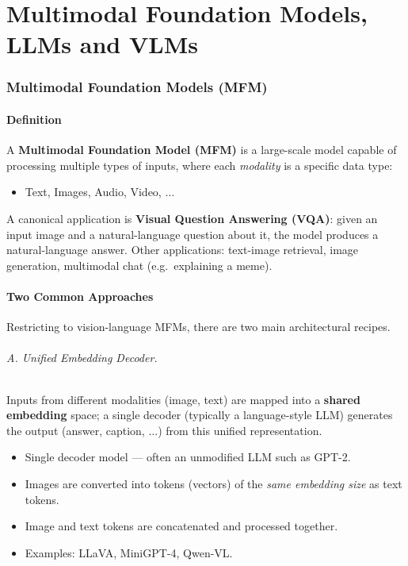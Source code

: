 \documentclass[11pt,a4paper]{article}
\theoremstyle{definition}
\theoremstyle{plain}
\theoremstyle{remark}
\begin{document}
\part{Multimodal Foundation Models, LLMs and VLMs}

\section{Multimodal Foundation Models (MFM)}

\subsection{Definition}

A \textbf{Multimodal Foundation Model (MFM)} is a large-scale model capable of processing multiple types of inputs, where each \emph{modality} is a specific data type:
\begin{itemize}
    \item Text, Images, Audio, Video, $\ldots$
\end{itemize}

A canonical application is \textbf{Visual Question Answering (VQA)}: given an input image and a natural-language question about it, the model produces a natural-language answer. Other applications: text-image retrieval, image generation, multimodal chat (e.g.\ explaining a meme).

\subsection{Two Common Approaches}

Restricting to vision-language MFMs, there are two main architectural recipes.

\paragraph{A. Unified Embedding Decoder.} Inputs from different modalities (image, text) are mapped into a \textbf{shared embedding} space; a single decoder (typically a language-style LLM) generates the output (answer, caption, $\ldots$) from this unified representation.
\begin{itemize}
    \item Single decoder model --- often an unmodified LLM such as GPT-2.
    \item Images are converted into tokens (vectors) of the \emph{same embedding size} as text tokens.
    \item Image and text tokens are concatenated and processed together.
    \item Examples: LLaVA, MiniGPT-4, Qwen-VL.
\end{itemize}
\end{document}
